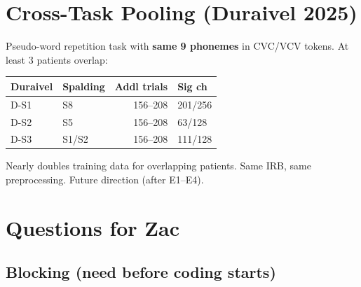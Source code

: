 \documentclass[11pt, letterpaper]{article}
\begin{document}
\section{Cross-Task Pooling (Duraivel 2025)}
\label{sec:crosstask}

Pseudo-word repetition task with \textbf{same 9 phonemes} in CVC/VCV tokens. At least 3 patients overlap:

\begin{table}[h]
\centering\small
\begin{tabular}{@{}llrl@{}}
\toprule
\textbf{Duraivel} & \textbf{Spalding} & \textbf{Addl trials} & \textbf{Sig ch} \\
\midrule
D-S1 & S8     & 156--208 & 201/256 \\
D-S2 & S5     & 156--208 & 63/128 \\
D-S3 & S1/S2  & 156--208 & 111/128 \\
\bottomrule
\end{tabular}
\end{table}

Nearly doubles training data for overlapping patients. Same IRB, same preprocessing. Future direction (after E1--E4).

\section{Questions for Zac}
\label{sec:questions}

\subsection{Blocking (need before coding starts)}
\end{document}
